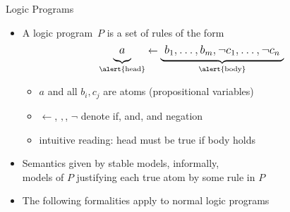 \begin{frame}{  Logic Programs}
  \begin{itemize}
  \item<2->
    A \alert{logic program}~$P$ is a \alert{set of rules} of the form
    \[\large
    \underbrace{a\raisebox{-4pt}{}}_{\text{\alert{head}}}\leftarrow\underbrace{\raisebox{-4pt}{\ }b_1,\dots,b_m,\neg{c_1},\dots,\neg{c_n}\raisebox{-4pt}{\ }}_{\alert{\text{body}}}
    \]
    \begin{itemize}
    \item $a$ and all $b_i,c_j$ are \alert{atoms} (propositional variables)
    \item \alert{$\leftarrow$}, \alert{$,$}, \alert{$\neg$} denote \alert{if}, \alert{and}, and \alert{negation}
    \item intuitive reading: \alert{head} must be true \alert{if body} holds
    \end{itemize}
    \medskip
  \item<3->
    Semantics given by \alert{stable models}, informally,\\
    models of $P$ justifying each true atom by some rule in $P$
    \bigskip
  \item<only@4>  The following formalities apply to normal logic programs
  \end{itemize}
\end{frame}
